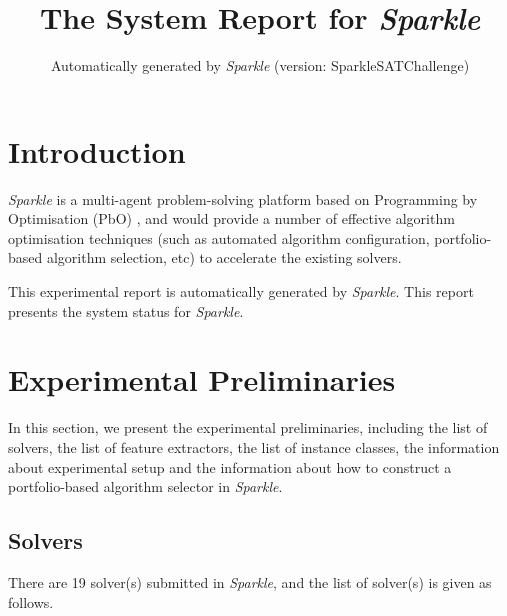 \documentclass[british]{article}
\title{The System Report for \emph{Sparkle} }
\author{ Automatically generated by \emph{Sparkle} (version: Sparkle\textunderscore SAT\textunderscore Challenge\textunderscore 2018) }
\begin{document}
\maketitle %


\section{Introduction}
\label{sec:Introduction}

\emph{Sparkle} \cite{Hoos15} is a multi-agent problem-solving platform based on Programming by Optimisation (PbO) \cite{Hoos12}, and would provide a number of effective algorithm optimisation techniques (such as automated algorithm configuration, portfolio-based algorithm selection, etc) to accelerate the existing solvers.

This experimental report is automatically generated by \emph{Sparkle}. This report presents the system status for \emph{Sparkle}.


\section{Experimental Preliminaries}
\label{sec:Experimental_Preliminaries}

In this section, we present the experimental preliminaries, including the list of solvers, the list of feature extractors, the list of instance classes, the information about experimental setup and the information about how to construct a portfolio-based algorithm selector in \emph{Sparkle}.

\subsection{Solvers}
\label{sec:Solvers}
There are 19 solver(s) submitted in \emph{Sparkle}, and the list of solver(s) is given as follows.
\end{document}
